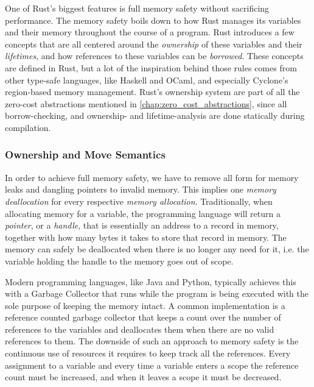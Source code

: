 One of Rust's biggest features is full memory safety \cite{web:rust_book_unsafe} without sacrificing performance.
The memory safety boils down to how Rust manages its variables and their memory throughout the course of a program.
Rust introduces a few concepts that are all centered around the \emph{ownership} of these variables and their \emph{lifetimes}, and how references to these variables can be \emph{borrowed}.
These concepts are defined in Rust, but a lot of the inspiration behind those rules comes from other type-safe languages, like Haskell and OCaml, and especially Cyclone's \cite{Grossman2002,Swamy2006} region-based memory management.
Rust's ownership system are part of all the zero-cost abstractions mentioned in \autoref{chap:zero_cost_abstractions}, since all borrow-checking, and ownership- and lifetime-analysis are done statically during compilation.

\subsubsection{Ownership and Move Semantics}
\label{sec:back:rust:own}

In order to achieve full memory safety, we have to remove all form for memory leaks and dangling pointers to invalid memory.
This implies one \emph{memory deallocation} for every respective \emph{memory allocation}.
Traditionally, when allocating memory for a variable, the programming language will return a \emph{pointer},  or a \emph{handle}, that is essentially an address to a record in memory, together with how many bytes it takes to store that record in memory.
The memory can safely be deallocated when there is no longer any need for it, i.e. the variable holding the handle to the memory goes out of scope.

Modern programming languages, like Java and Python, typically achieves this with a Garbage Collector that runs while the program is being executed with the sole purpose of keeping the memory intact.
A common implementation is a reference counted garbage collector that keeps a count over the number of references to the variables and deallocates them when there are no valid references to them.
The downside of such an approach to memory safety is the continuous use of resources it requires to keep track all the references.
Every assignment to a variable and every time a variable enters a scope the reference count must be increased, and when it leaves a scope it must be decreased.

